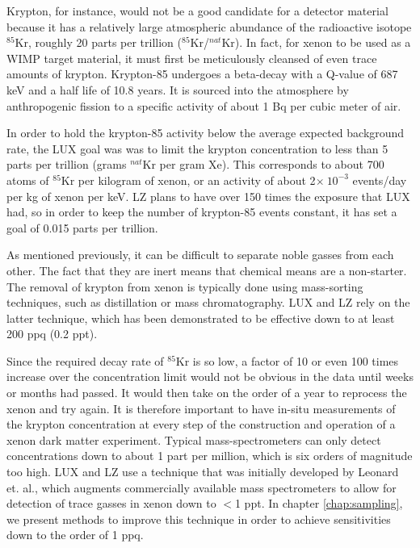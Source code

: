 Krypton, for instance, would not be a good candidate for a detector material because it has a relatively large atmospheric abundance of the radioactive isotope $^{85}$Kr, roughly 20 parts per trillion ($^{85}$Kr/$^{nat}$Kr). In fact, for xenon to be used as a WIMP target material, it must first be meticulously cleansed of even trace amounts of krypton. Krypton-85 undergoes a beta-decay with a Q-value of 687 keV and a half life of 10.8 years. It is sourced into the atmosphere by anthropogenic fission to a specific activity of about 1 Bq per cubic meter of air. 

In order to hold the krypton-85 activity below the average expected background rate, the LUX goal was was to limit the krypton concentration to less than 5 parts per trillion (grams $^{nat}$Kr per gram Xe). This corresponds to about 700 atoms of $^{85}$Kr per kilogram of xenon, or an activity of about 2$\times \ 10^{-3}$ events/day per kg of xenon per keV. LZ plans to have over 150 times the exposure that LUX had, so in order to keep the number of krypton-85 events constant, it has set a goal of 0.015 parts per trillion\cite{lz_tdr}. 

As mentioned previously, it can be difficult to separate noble gasses from each other. The fact that they are inert means that chemical means are a non-starter. The removal of krypton from xenon is typically done using mass-sorting techniques, such as distillation or mass chromatography. LUX and LZ rely on the latter technique, which has been demonstrated to be effective down to at least 200 ppq (0.2 ppt)\cite{lz_tdr,lux_krremoval}.

Since the required decay rate of $^{85}$Kr is so low, a factor of 10 or even 100 times increase over the concentration limit would not be obvious in the data until weeks or months had passed. It would then take on the order of a year to reprocess the xenon and try again. It is therefore important to have in-situ measurements of the krypton concentration at every step of the construction and operation of a xenon dark matter experiment. Typical mass-spectrometers can only detect concentrations down to about 1 part per million, which is six orders of magnitude too high. LUX and LZ use a technique that was initially developed by Leonard et. al., which augments commercially available mass spectrometers to allow for detection of trace gasses in xenon down to $<$1 ppt\cite{sampling_doug}. In chapter \ref{chap:sampling}, we present methods to improve this technique in order to achieve sensitivities down to the order of 1 ppq. 

